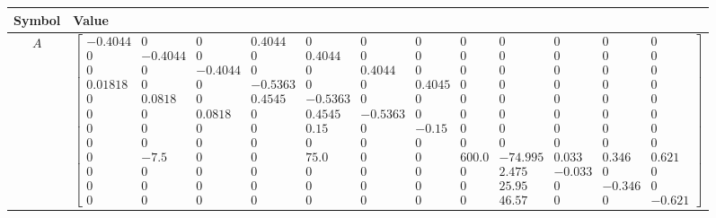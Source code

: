 \begin{tabular}{cl}
\hline
  Symbol  & Value                                                                                                                                                                                                                                                                                                                                                                                                                                                                                                                                                                                                                                                                                                                                                                                   \\
\hline
   $A$    & $\left[\begin{array}{cccccccccccc}-0.4044 & 0 & 0 & 0.4044 & 0 & 0 & 0 & 0 & 0 & 0 & 0 & 0\\0 & -0.4044 & 0 & 0 & 0.4044 & 0 & 0 & 0 & 0 & 0 & 0 & 0\\0 & 0 & -0.4044 & 0 & 0 & 0.4044 & 0 & 0 & 0 & 0 & 0 & 0\\0.01818 & 0 & 0 & -0.5363 & 0 & 0 & 0.4045 & 0 & 0 & 0 & 0 & 0\\0 & 0.0818 & 0 & 0.4545 & -0.5363 & 0 & 0 & 0 & 0 & 0 & 0 & 0\\0 & 0 & 0.0818 & 0 & 0.4545 & -0.5363 & 0 & 0 & 0 & 0 & 0 & 0\\0 & 0 & 0 & 0 & 0.15 & 0 & -0.15 & 0 & 0 & 0 & 0 & 0\\0 & 0 & 0 & 0 & 0 & 0 & 0 & 0 & 0 & 0 & 0 & 0\\0 & -7.5 & 0 & 0 & 75.0 & 0 & 0 & 600.0 & -74.995 & 0.033 & 0.346 & 0.621\\0 & 0 & 0 & 0 & 0 & 0 & 0 & 0 & 2.475 & -0.033 & 0 & 0\\0 & 0 & 0 & 0 & 0 & 0 & 0 & 0 & 25.95 & 0 & -0.346 & 0\\0 & 0 & 0 & 0 & 0 & 0 & 0 & 0 & 46.57 & 0 & 0 & -0.621\end{array}\right]$ \\

\end{tabular}
